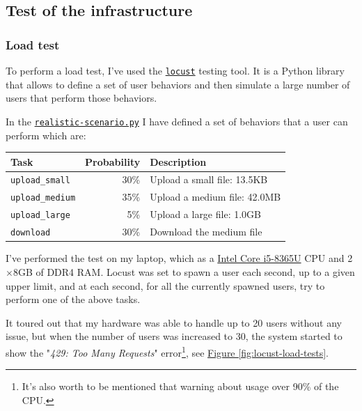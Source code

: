 \subsection{Test of the infrastructure}
\label{subsec:test}
\subsubsection{Load test}
\label{subsubsec:test}

To perform a load test, I've used the \href{https://locust.io/}{\texttt{locust}} testing tool. It is a Python library that allows to define a set of user behaviors and then simulate a large number of users that perform those behaviors.

In the \href{https://github.com/IsacPasianotto/cloud-computing-assignment/blob/main/exercise01/locust/realistic-scenario.py}{\texttt{realistic-scenario.py}} I have defined a set of behaviors that a user can perform which are: 


\begin{center}
    \begin{tabular}{lrl}
        \hline
        Task & Probability & Description \\
        \hline
        \texttt{upload\_small} & 30\% & Upload a small file: 13.5KB \\
        \texttt{upload\_medium} & 35\% & Upload a medium file: 42.0MB \\
        \texttt{upload\_large} & 5\% & Upload a large file: 1.0GB \\
        \texttt{download} & 30\% & Download the medium file \\
        \hline
    \end{tabular}
\end{center}

I've performed the test on my laptop, which as a \href{https://www.intel.com/content/www/us/en/products/sku/193555/intel-core-i58365u-processor-6m-cache-up-to-4-10-ghz/specifications.html}{Intel Core i5-8365U} CPU and 2$\times$8GB of DDR4 RAM.
Locust was set to spawn a user each second, up to a given upper limit, and at each second, for all the currently spawned users, try to perform one of the above tasks.

It toured out that my hardware was able to handle up to 20 users without any issue, but when the number of users was increased to 30, the system started to show the "\textit{429: Too Many Requests}" error\footnote{It's also worth to be mentioned that warning about usage over 90\% of the CPU.}, see \hyperref[fig:locust-load-tests]{Figure \ref{fig:locust-load-tests}}. 

